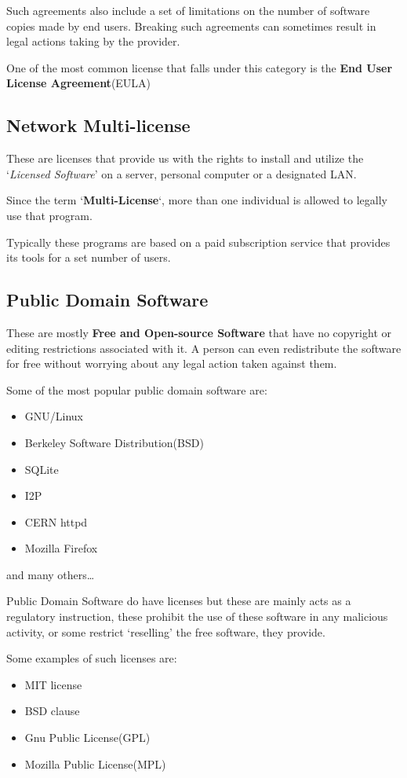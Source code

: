 \documentclass[12pt, a4paper]{article}
\begin{document}
Such agreements also include a set of limitations on the number of software
copies made by end users. Breaking such agreements can sometimes result in
legal actions taking by the provider.

One of the most common license that falls under this category is the
\textbf{End User License Agreement}(EULA)

\subsection{Network Multi-license}
These are licenses that provide us with the rights to install and utilize the
`\emph{Licensed Software}' on a server, personal computer or a designated LAN.

Since the term `\textbf{Multi-License}`, more than one individual is allowed
to legally use that program.

Typically these programs are based on a paid subscription service that
provides its tools for a set number of users.

\subsection{Public Domain Software}
These are mostly \textbf{Free and Open-source Software} that have no copyright
or editing restrictions associated with it. A person can even redistribute the
software for free without worrying about any legal action taken against them.

Some of the most popular public domain software are:
\begin{itemize}
  \item GNU/Linux
  \item Berkeley Software Distribution(BSD)
  \item SQLite
  \item I2P
  \item CERN httpd
  \item Mozilla Firefox
\end{itemize}
and many others\dots

Public Domain Software do have licenses but these are mainly acts as a
regulatory instruction, these prohibit the use of these software in any
malicious activity, or some restrict `reselling' the free software, they
provide.

Some examples of such licenses are:
\begin{itemize}
  \item MIT license
  \item BSD clause
  \item Gnu Public License(GPL)
  \item Mozilla Public License(MPL)
\end{itemize}
\end{document}
